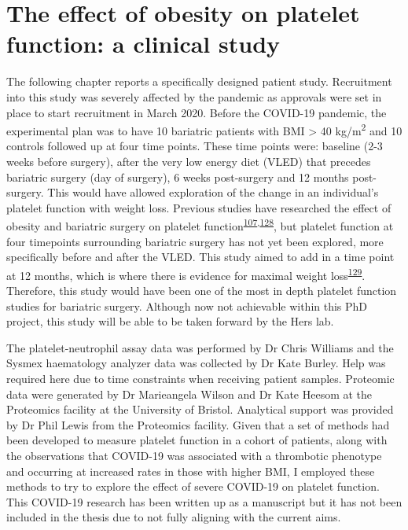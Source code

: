 \documentclass[11pt,twoside]{bristolthesis}
\begin{document}
\hypertarget{BMI-platelets-clinic}{%
\chapter{The effect of obesity on platelet function: a clinical study}\label{BMI-platelets-clinic}}

The following chapter reports a specifically designed patient study. Recruitment into this study was severely affected by the pandemic as approvals were set in place to start recruitment in March 2020. Before the COVID-19 pandemic, the experimental plan was to have 10 bariatric patients with BMI \textgreater{} 40 kg/m\textsuperscript{2} and 10 controls followed up at four time points. These time points were: baseline (2-3 weeks before surgery), after the very low energy diet (VLED) that precedes bariatric surgery (day of surgery), 6 weeks post-surgery and 12 months post-surgery. This would have allowed exploration of the change in an individual's platelet function with weight loss. Previous studies have researched the effect of obesity and bariatric surgery on platelet function\textsuperscript{\protect\hyperlink{ref-Barrachina2019}{107},\protect\hyperlink{ref-Dobrydneva2012}{128}}, but platelet function at four timepoints surrounding bariatric surgery has not yet been explored, more specifically before and after the VLED. This study aimed to add in a time point at 12 months, which is where there is evidence for maximal weight loss\textsuperscript{\protect\hyperlink{ref-Maciejewski2016}{129}}. Therefore, this study would have been one of the most in depth platelet function studies for bariatric surgery. Although now not achievable within this PhD project, this study will be able to be taken forward by the Hers lab.

The platelet-neutrophil assay data was performed by Dr Chris Williams and the Sysmex haematology analyzer data was collected by Dr Kate Burley. Help was required here due to time constraints when receiving patient samples. Proteomic data were generated by Dr Marieangela Wilson and Dr Kate Heesom at the Proteomics facility at the University of Bristol. Analytical support was provided by Dr Phil Lewis from the Proteomics facility. Given that a set of methods had been developed to measure platelet function in a cohort of patients, along with the observations that COVID-19 was associated with a thrombotic phenotype and occurring at increased rates in those with higher BMI, I employed these methods to try to explore the effect of severe COVID-19 on platelet function. This COVID-19 research has been written up as a manuscript but it has not been included in the thesis due to not fully aligning with the current aims.
\end{document}
